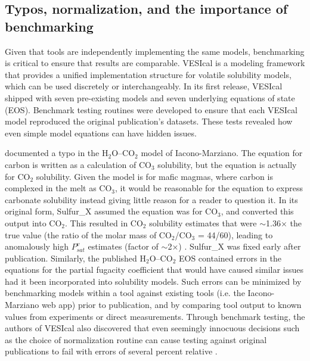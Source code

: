 \documentclass[draft, english]{volcanica-template}
\begin{document}
\subsection{Typos, normalization, and the importance of benchmarking}
Given that tools are independently implementing the same models, benchmarking is critical to ensure that results are comparable. VESIcal \parencite{Iacovino2021, WieserVESIcal2022} is a modeling framework that provides a unified implementation structure for volatile solubility models, which can be used discretely or interchangeably. In its first release, VESIcal shipped with seven pre-existing models and seven underlying equations of state (EOS). Benchmark testing routines were developed to ensure that each VESIcal model reproduced the original publication's datasets. These tests revealed how even simple model equations can have hidden issues.

\textcite{Iacovino2021} documented a typo in the H$_2$O–CO$_2$ model of Iacono-Marziano. The equation for carbon is written as a calculation of CO$_3$ solubility, but the equation is actually for CO$_2$ solubility. Given the model is for mafic magmas, where carbon is complexed in the melt as CO$_3$, it would be reasonable for the equation to express carbonate solubility instead giving little reason for a reader to question it. In its original form, Sulfur\_X assumed the equation was for CO$_3$, and converted this output into CO$_2$. This resulted in CO$_2$ solubility estimates that were $\sim$1.36× the true value (the ratio of the molar mass of CO$_2$/CO$_3$ = 44/60), leading to anomalously high $P^v_{sat}$ estimates (factor of $\sim$2×) . Sulfur\_X was fixed early after publication. Similarly, the published \textcite{duan2006equation} H$_2$O–CO$_2$ EOS contained errors in the equations for the partial fugacity coefficient \parencite{yoshimura2023carbon} that would have caused similar issues had it been incorporated into solubility models. Such errors can be minimized by benchmarking models within a tool against existing tools (i.e. the Iacono-Marziano web app) prior to publication, and by comparing tool output to known values from experiments or direct measurements. Through benchmark testing, the authors of VESIcal also discovered that even seemingly innocuous decisions such as the choice of normalization routine can cause testing against original publications to fail with errors of several percent relative \parencite{Iacovino2021}.
\end{document}
